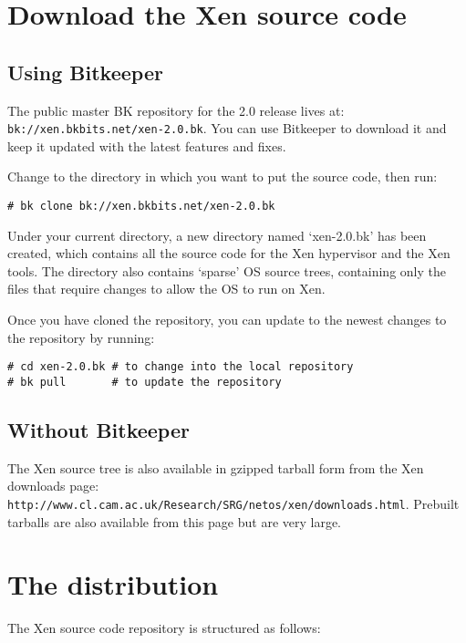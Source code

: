 \documentclass[11pt,twoside,final,openright]{xenstyle}
\begin{document}
\section{Download the Xen source code}

\subsection{Using Bitkeeper}

The public master BK repository for the 2.0 release lives at: \\
{\tt bk://xen.bkbits.net/xen-2.0.bk}.  You can use Bitkeeper to
download it and keep it updated with the latest features and fixes.

Change to the directory in which you want to put the source code, then
run:
\begin{verbatim}
# bk clone bk://xen.bkbits.net/xen-2.0.bk
\end{verbatim}

Under your current directory, a new directory named `xen-2.0.bk' has
been created, which contains all the source code for the Xen
hypervisor and the Xen tools.  The directory also contains `sparse' OS
source trees, containing only the files that require changes to allow
the OS to run on Xen.

Once you have cloned the repository, you can update to the newest
changes to the repository by running:
\begin{verbatim}
# cd xen-2.0.bk # to change into the local repository
# bk pull       # to update the repository
\end{verbatim}

\subsection{Without Bitkeeper}

The Xen source tree is also available in gzipped tarball form from the
Xen downloads page:\\
{\tt http://www.cl.cam.ac.uk/Research/SRG/netos/xen/downloads.html}.
Prebuilt tarballs are also available from this page but are very large.

\section{The distribution}

The Xen source code repository is structured as follows:
\end{document}

